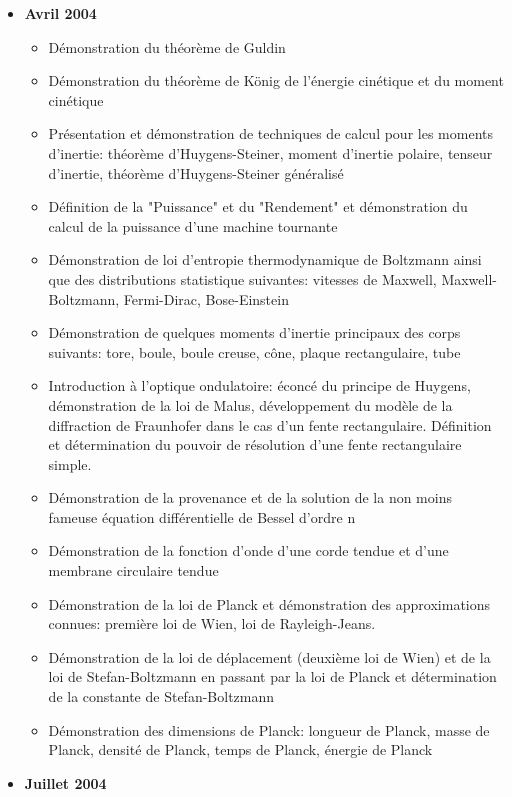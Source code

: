 \documentclass[12pt,a4paper,twoside,openright]{report}
\theoremstyle{definition}
\theoremstyle{itexmp}
\numberwithin{equation}{section}
\begin{document}
\begin{itemize}
\begin{itemize}[noitemsep]
			\end{itemize}
		\item \textbf{Avril 2004}
			\begin{itemize}[noitemsep]
				\item Démonstration du théorème de Guldin
				\item Démonstration du théorème de König de l'énergie cinétique et du moment cinétique
				\item Présentation et démonstration de techniques de calcul pour les moments d'inertie: théorème d'Huygens-Steiner, moment d'inertie polaire, tenseur d'inertie, théorème d'Huygens-Steiner généralisé
				\item Définition de la "Puissance" et du "Rendement" et démonstration du calcul de la puissance d'une machine tournante
				\item Démonstration de loi d'entropie thermodynamique de Boltzmann ainsi que des distributions statistique suivantes: vitesses de Maxwell, Maxwell-Boltzmann, Fermi-Dirac, Bose-Einstein
				\item Démonstration de quelques moments d'inertie principaux des corps suivants: tore, boule, boule creuse, cône, plaque rectangulaire, tube
				\item Introduction à l'optique ondulatoire: éconcé du principe de Huygens, démonstration de la loi de Malus, développement du modèle de la diffraction de Fraunhofer dans le cas d'un fente rectangulaire. Définition et détermination du pouvoir de résolution d'une fente rectangulaire simple.
				\item Démonstration de la provenance et de la solution de la non moins fameuse équation différentielle de Bessel d'ordre n
				\item Démonstration de la fonction d'onde d'une corde tendue et d'une membrane circulaire tendue
				\item Démonstration de la loi de Planck et démonstration des approximations connues: première loi de Wien, loi de Rayleigh-Jeans.
				\item Démonstration de la loi de déplacement (deuxième loi de Wien) et de la loi de Stefan-Boltzmann en passant par la loi de Planck et détermination de la constante de Stefan-Boltzmann
				\item Démonstration des dimensions de Planck: longueur de Planck, masse de Planck, densité de Planck, temps de Planck, énergie de Planck
			\end{itemize}
		\item \textbf{Juillet 2004}
			\begin{itemize}[noitemsep]

\end{itemize}
\end{itemize}
\end{document}
